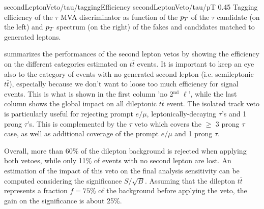                      {secondLeptonVeto/tau/taggingEfficiency}
                     {secondLeptonVeto/tau/pT}
                     {0.45}
                     {Tagging efficiency of the $\tau$ MVA discriminator as function of the
                     $p_T$ of the $\tau$ candidate (on the left) and $p_T$ spectrum (on the
                     right) of the fakes and candidates matched to generated leptons.}

     summarizes the performances of the
    second lepton vetos by showing the efficiency on the different categories estimated on
    $t\bar{t}$ events. It is important to keep an eye also to the category of events with no
    generated second lepton (i.e. semileptonic $t\bar{t}$), especially because we don't
    want to loose too much efficiency for signal events. This is what is shown in the first
    column 'no 2$^\text{nd}$ $\ell$', while the last column shows the global impact on all
    dileptonic $t\bar{t}$ event. The isolated track veto is particularly useful for rejecting
    prompt $e/\mu$, leptonically-decaying $\tau$'s and 1 prong $\tau$'s. This is complemented
    by the $\tau$ veto which covers the $\geq$ 3 prong $\tau$ case, as well as additional
    coverage of the prompt $e/\mu$ and 1 prong $\tau$.

    Overall, more than 60\% of the dilepton background is rejected when applying both
    vetoes, while only 11\% of events with no second lepton are lost. An estimation of the
    impact of this veto on the final analysis sensitivity can be computed considering the
    significance $S/\sqrt{B}$. Assuming that the dilepton $t\bar{t}$ represents a fraction
    $f = 75\%$ of the background before applying the veto, the gain on the significance
    is about 25\%.

